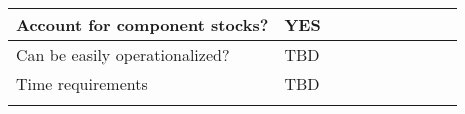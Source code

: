 \documentclass[french,11pt]{book}
\begin{document}
\begin{landscapepage}
\begin{longtable}[t]{>{\raggedright\arraybackslash}p{20em}l>{}l>{}l>{}l>{}l>{}l>{}l>{}l>{}l}
\midrule Account for component stocks? & YES & \cellcolor{white}{NO} & \cellcolor{white}{NO} & \cellcolor[HTML]{F1CF31}{MAYBE} & \cellcolor[HTML]{F1CF31}{MAYBE} & \cellcolor[HTML]{b8e186}{YES} & \cellcolor[HTML]{b8e186}{YES} & \cellcolor[HTML]{b8e186}{YES} & \cellcolor[HTML]{b8e186}{YES}\\
\midrule Can be easily operationalized? & TBD & \cellcolor[HTML]{b8e186}{YES} & \cellcolor[HTML]{b8e186}{YES} & \cellcolor[HTML]{b8e186}{YES} & \cellcolor[HTML]{b8e186}{YES} & \cellcolor[HTML]{b8e186}{YES} & \cellcolor[HTML]{b8e186}{YES} & \cellcolor[HTML]{b8e186}{YES} & \cellcolor[HTML]{b8e186}{YES}\\
\midrule Time requirements & TBD & \cellcolor{white}{Short} & \cellcolor{white}{Short} & \cellcolor{white}{Short} & \cellcolor{white}{Short} & \cellcolor{white}{Med} & \cellcolor{white}{Med} & \cellcolor{white}{Med} & \cellcolor{white}{Long}\\* \end{longtable} \endgroup{} \endgroup{}



\end{landscapepage}
\clearpage
\end{document}
